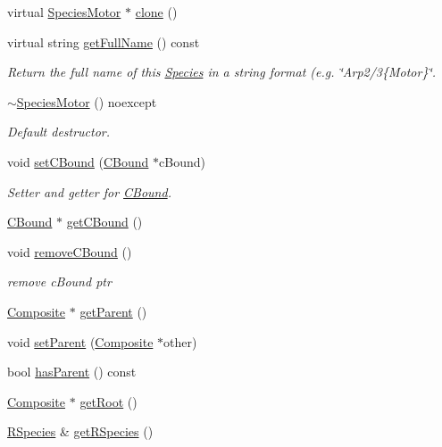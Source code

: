 \begin{DoxyCompactItemize}
virtual \hyperlink{classSpeciesMotor}{Species\+Motor} $\ast$ \hyperlink{classSpeciesMotor_a8b035f81717d4c29546f47ada9924b62}{clone} ()
\item 
virtual string \hyperlink{classSpeciesMotor_a31f9c0c447c007c1ba04bb0ce1d9c0e1}{get\+Full\+Name} () const 
\begin{DoxyCompactList}\small\item\em Return the full name of this \hyperlink{classSpecies}{Species} in a string format (e.\+g. \char`\"{}\+Arp2/3\{\+Motor\}\char`\"{}. \end{DoxyCompactList}\item 
\hyperlink{classSpeciesMotor_ae53e668a63ea2c7e725449913467fb79}{$\sim$\+Species\+Motor} () noexcept
\begin{DoxyCompactList}\small\item\em Default destructor. \end{DoxyCompactList}\item 
void \hyperlink{classSpeciesBound_a33c3de1c4a1e2f63f390b2bfd53fcfa1}{set\+C\+Bound} (\hyperlink{classCBound}{C\+Bound} $\ast$c\+Bound)
\begin{DoxyCompactList}\small\item\em Setter and getter for \hyperlink{classCBound}{C\+Bound}. \end{DoxyCompactList}\item 
\hyperlink{classCBound}{C\+Bound} $\ast$ \hyperlink{classSpeciesBound_ad55d11c86de01f2381ac9d5a286d8cea}{get\+C\+Bound} ()
\item 
void \hyperlink{classSpeciesBound_a904307cc8343605a9dbb05d4f2fa6bf9}{remove\+C\+Bound} ()
\begin{DoxyCompactList}\small\item\em remove c\+Bound ptr \end{DoxyCompactList}\item 
\hyperlink{classComposite}{Composite} $\ast$ \hyperlink{classSpecies_af24cab7cbaa561d35b08fef5faf05fdf}{get\+Parent} ()
\item 
void \hyperlink{classSpecies_acc64c5b61abf911872d433ac32b62de8}{set\+Parent} (\hyperlink{classComposite}{Composite} $\ast$other)
\item 
bool \hyperlink{classSpecies_a40262d7217fcc28a31682aee40a19232}{has\+Parent} () const 
\item 
\hyperlink{classComposite}{Composite} $\ast$ \hyperlink{classSpecies_a876c8a827476a11e05f3b7a7669c29b6}{get\+Root} ()
\item 
\hyperlink{classRSpecies}{R\+Species} \& \hyperlink{classSpecies_a048dd7bc3fecd08b1b1797dc83aa163d}{get\+R\+Species} ()

\end{DoxyCompactItemize}
